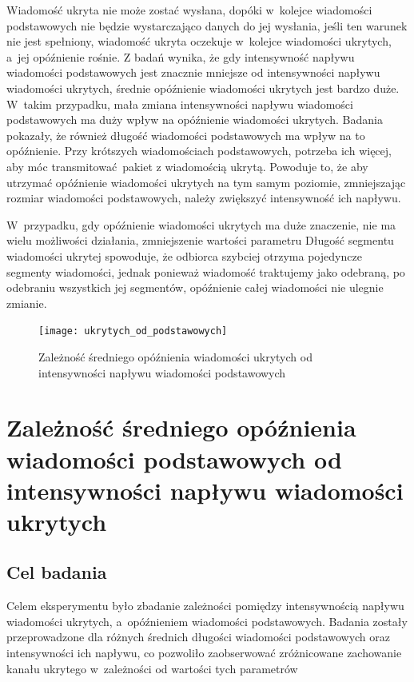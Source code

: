 \documentclass[a4paper, twoside, 12pt]{report}
\begin{document}
            Wiadomość ukryta nie może zostać wysłana, dopóki w~kolejce wiadomości
            podstawowych nie będzie wystarczająco danych do jej wysłania, jeśli ten
            warunek nie jest spełniony, wiadomość ukryta oczekuje w~kolejce wiadomości
            ukrytych, a~jej opóźnienie rośnie. Z badań wynika, że gdy intensywność
            napływu wiadomości podstawowych jest znacznie mniejsze od intensywności
            napływu wiadomości ukrytych, średnie opóźnienie wiadomości ukrytych jest
            bardzo duże. W~takim przypadku, mała zmiana intensywności napływu wiadomości
            podstawowych ma duży wpływ na opóźnienie wiadomości ukrytych. Badania
            pokazały, że również długość wiadomości podstawowych ma wpływ na to opóźnienie.
            Przy krótszych wiadomościach podstawowych, potrzeba ich więcej, aby móc
            transmitować pakiet z wiadomością ukrytą. Powoduje to, że aby utrzymać
            opóźnienie wiadomości ukrytych na tym samym poziomie, zmniejszając rozmiar
            wiadomości podstawowych, należy zwiększyć intensywność ich napływu.

            W~przypadku, gdy opóźnienie wiadomości ukrytych ma duże znaczenie,
            nie ma wielu możliwości działania, zmniejszenie wartości parametru Długość
            segmentu wiadomości ukrytej spowoduje, że odbiorca szybciej otrzyma
            pojedyncze segmenty wiadomości, jednak ponieważ wiadomość traktujemy jako odebraną,
            po odebraniu wszystkich jej segmentów, opóźnienie całej wiadomości
            nie ulegnie zmianie.

        \begin{figure}[h]
                \centering
                \texttt{[image: ukrytych\_od\_podstawowych]}
                \caption{Zależność średniego opóźnienia wiadomości ukrytych od
                    intensywności napływu wiadomości podstawowych}
                \label{OPOZNIENIEUKRYTYCHODPODSTAWOWYCH}
        \end{figure}

    \section{Zależność średniego opóźnienia wiadomości podstawowych od intensywności napływu wiadomości ukrytych} \label{OPOZNIENEPODSTAWOWYCHODUKRYTYCH}
        \subsection{Cel badania}
            Celem eksperymentu było zbadanie zależności pomiędzy intensywnością
            napływu wiadomości ukrytych, a~opóźnieniem wiadomości podstawowych.
            Badania zostały przeprowadzone dla różnych średnich długości wiadomości
            podstawowych oraz intensywności ich napływu, co pozwoliło zaobserwować
            zróżnicowane zachowanie kanału ukrytego w~zależności od wartości tych
            parametrów
\end{document}
